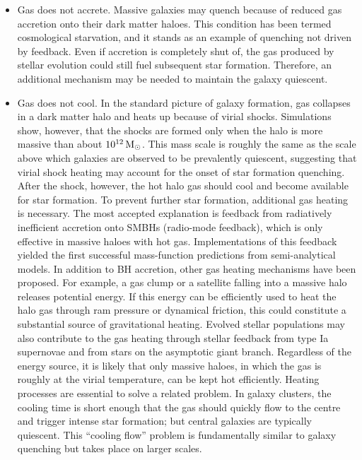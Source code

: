 \documentclass[a4paper,10pt]{article}
\begin{document}
\begin{itemize}
    \item Gas does not accrete. Massive galaxies may quench because of reduced gas accretion onto their dark matter haloes. This condition has been termed cosmological starvation, and it stands as an example of quenching not driven by feedback. Even if accretion is completely shut of, the gas produced by stellar evolution could still fuel subsequent star formation. Therefore, an additional mechanism may be needed to maintain the galaxy quiescent.
    \item Gas does not cool. In the standard picture of galaxy formation, gas collapses in a dark matter halo and heats up because of virial shocks. Simulations show, however, that the shocks are formed only when the halo is more massive than about $10^{12}\,{\rm M_\odot}$. This mass scale is roughly the same as the scale above which galaxies are observed to be prevalently quiescent, suggesting that virial shock heating may account for the onset of star formation quenching. After the shock, however, the hot halo gas should cool and become available for star formation. To prevent further star formation, additional gas heating is necessary. The most accepted explanation is feedback from radiatively inefficient accretion onto SMBHs (radio-mode feedback), which is only effective in massive haloes with hot gas. Implementations of this feedback yielded the first successful mass-function predictions from semi-analytical models. In addition to BH accretion, other gas heating mechanisms have been proposed. For example, a gas clump or a satellite falling into a massive halo releases potential energy. If this energy can be efficiently used to heat the halo gas through ram pressure or dynamical friction, this could constitute a substantial source of gravitational heating. Evolved stellar populations may also contribute to the gas heating through stellar feedback from type Ia supernovae and from stars on the asymptotic giant branch. Regardless of the energy source, it is likely that only massive haloes, in which the gas is roughly at the virial temperature, can be kept hot efficiently. Heating processes are essential to solve a related problem. In galaxy clusters, the cooling time is short enough that the gas should quickly flow to the centre and trigger intense star formation; but central galaxies are typically quiescent. This ``cooling flow'' problem is fundamentally similar to galaxy quenching but takes place on larger scales.

\end{itemize}
\end{document}
